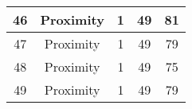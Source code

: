 \documentclass[results.tex]{subfiles}
\begin{document}
\begin{center}
\begin{tabular}{| c || c | c | c | c |}
            \hline
            46                      & Proximity                    & 1                      & 49                      & 81                   \\
            \hline
            47                      & Proximity                    & 1                      & 49                      & 79                   \\
            \hline
            48                      & Proximity                    & 1                      & 49                      & 75                   \\
            \hline
            49                      & Proximity                    & 1                      & 49                      & 79                   \\
            \hline
        \end{tabular}
    \end{center}
\end{document}
